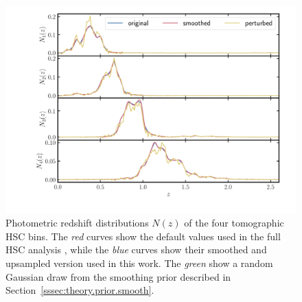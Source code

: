 \documentclass[a4paper,11pt]{article}
\begin{document}
\begin{figure}[ht]
\centering  
\includegraphics[width=1.\textwidth]{./Nzs}
\caption{Photometric redshift
distributions $N(z)$
of the four tomographic HSC bins.
The \textit{red} curves show the
default values used in the 
full HSC analysis \cite{1912.08209},
while the \textit{blue} curves 
show their smoothed and upsampled 
version used in this work. The
\textit{green} show a random 
Gaussian draw from the smoothing 
prior described in Section~\ref{sssec:theory.prior.smooth}.}
\label{fig:Nzs}
\end{figure}
\end{document}
